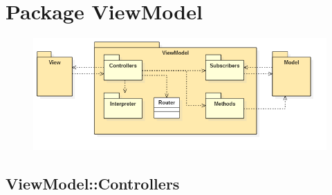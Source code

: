 \section{Package ViewModel}
\begin{figure}[h!]
\begin{center}
	\includegraphics[scale=0.7]{../images/ViewModelPackage.png}
\end{center}
\end{figure}
\subsection{ViewModel::Controllers}
